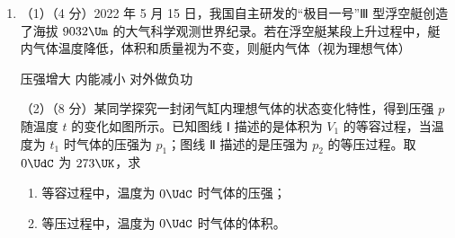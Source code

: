 \documentclass[\gkver]{gaokaozhenti}
\begin{document}
\begin{enumerate}
{虫在 $x$ 轴上飞出的位置范围为

$\frac{1 - 2\sqrt 6}{3}H \le x \le 2H$

（3）设蛙的运动时间为 $t_{1}$，有

$\frac{1}{2}gt_{1}^{2} + \frac{1}{2}a_{y}(\sqrt 2 t_{1})^{2} = H$

$\frac{1}{2}gt_{2}^{2} + \frac{1}{2}a_{y}(\sqrt{17}t_{2})^{2} = H$

解得

$t_{1} = \sqrt{\frac{6H}{5g}}$，$t_{2} = \sqrt{\frac{3H}{10g}}$

而

$v_{1}t_{1} + \frac{1}{2}a_{x}(\sqrt 2 t_{1})^{2} = x_{1}$

$v_{1}t_{2} + \frac{1}{2}a_{x}(\sqrt{17}t_{2})^{2} = x_{1}$

解得

$v_{1} = \frac{1}{5}\sqrt{30gH}$，$x_{1} = \frac{26}{15}H$

而

$v_{1}t_{1} + \frac{1}{2}a_{x}(\sqrt 2 t_{1})^{2} = x_{2}$

$\frac{1}{2}a_{x}(\sqrt{17}t_{2})^{2} - v_{2}t_{2} = x_{2}$

解得

$v_{2} = \frac{1}{15}\sqrt{30gH}$，$x_{1} = \frac{14}{15}H$
}

\item
（1）（4 分）2022 年 5 月 15 日，我国自主研发的“极目一号”Ⅲ 型浮空艇创造了海拔 $9032\Um$ 的大气科学观测世界纪录。若在浮空艇某段上升过程中，艇内气体温度降低，体积和质量视为不变，则艇内气体（视为理想气体）

{压强增大}
{内能减小}
{对外做负功}

（2）（8 分）某同学探究一封闭气缸内理想气体的状态变化特性，得到压强 $p$ 随温度 $t$ 的变化如图所示。已知图线 Ⅰ 描述的是体积为 $V_{1}$ 的等容过程，当温度为 $t_{1}$ 时气体的压强为 $p_{1}$；图线 Ⅱ 描述的是压强为 $p_{2}$ 的等压过程。取 $0\UdC$ 为 $273\UK$，求
\begin{enumerate}
	\item
	等容过程中，温度为 $0\UdC$ 时气体的压强；
	\item
	等压过程中，温度为 $0\UdC$ 时气体的体积。
\end{enumerate}



\end{enumerate}
\end{document}
